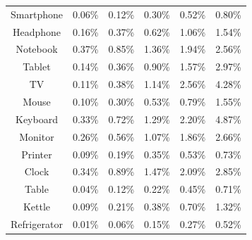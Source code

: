 \documentclass[msom,non-blindrev]{informs3} %
\theoremstyle{definition}
\begin{document}
\begin{table}[t]
{\begin{tabular}{|c|c|c|c|c|c|}
\hline
Smartphone & 0.06\% & 0.12\% & 0.30\% & 0.52\% & 0.80\% \\
Headphone & 0.16\% & 0.37\% & 0.62\% & 1.06\% & 1.54\% \\
Notebook & 0.37\% & 0.85\% & 1.36\% & 1.94\% & 2.56\% \\
Tablet & 0.14\% & 0.36\% & 0.90\% & 1.57\% & 2.97\% \\
TV & 0.11\% & 0.38\% & 1.14\% & 2.56\% & 4.28\% \\
Mouse & 0.10\%  & 0.30\%  & 0.53\% & 0.79\% & 1.55\% \\
Keyboard & 0.33\% & 0.72\% & 1.29\% & 2.20\%  & 4.87\% \\
Monitor & 0.26\% & 0.56\% & 1.07\% & 1.86\% & 2.66\% \\
Printer & 0.09\% & 0.19\% & 0.35\% & 0.53\% & 0.73\% \\
Clock & 0.34\% & 0.89\% & 1.47\% & 2.09\% & 2.85\% \\
Table & 0.04\% & 0.12\% & 0.22\% & 0.45\% & 0.71\% \\
Kettle & 0.09\% & 0.21\% & 0.38\% & 0.70\%  & 1.32\% \\
Refrigerator & 0.01\% & 0.06\% & 0.15\% & 0.27\% & 0.52\% \\
\hline
\end{tabular}
}


\end{table}
\end{document}
